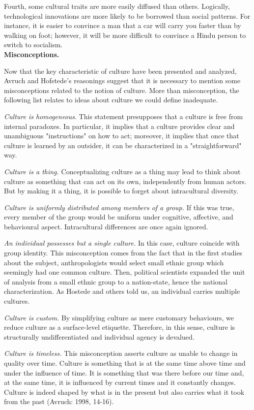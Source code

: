 \documentclass[../main.tex]{subfiles}
\begin{document}
Fourth, some cultural traits are more easily diffused than others. Logically, technological innovations are more likely to be borrowed than social patterns. For instance, it is easier to convince a man that a car will carry you faster than by walking on foot; however, it will be more difficult to convince a Hindu person to switch to socialism.\\

\textbf{Misconceptions.}

Now that the key characteristic of culture have been presented and analyzed, Avruch and Hofstede's reasonings suggest that it is necessary to mention some misconceptions related to the notion of culture. More than misconception, the following list relates to ideas about culture we could define inadequate.

\textit{Culture is homogeneous}. This statement presupposes that a culture is free from internal paradoxes. In particular, it implies that a culture provides clear and unambiguous "instructions" on how to act; moreover, it implies that once that culture is learned by an outsider, it can be characterized in a "straightforward" way.

\textit{Culture is a thing.} Conceptualizing culture as a thing may lead to think about culture as something that can act on its own, independently from human actors. But by making it a thing, it is possible to forget about intracultural diversity.

\textit{Culture is uniformly distributed among members of a group.} If this was true, every member of the group would be uniform under cognitive, affective, and behavioural aspect. Intracultural differences are once again ignored.

\textit{An individual possesses but a single culture.} In this case, culture coincide with group identity. This misconception comes from the fact that in the first studies about the subject, anthropologists would select small ethnic group which seemingly had one common culture. Then, political scientists expanded the unit of analysis from a small ethnic group to a nation-state, hence the national characterization. As Hostede and others told us, an individual carries multiple cultures.

\textit{Culture is custom.} By simplifying culture as mere customary behaviours, we reduce culture as a surface-level etiquette. Therefore, in this sense, culture is structurally undifferentiated and individual agency is devalued.

\textit{Culture is timeless.} This misconception asserts culture as unable to change in quality over time. Culture is something that is at the same time above time and under the influence of time. It is something that was there before our time and, at the same time, it is influenced by current times and it constantly changes. Culture is indeed shaped by what is in the present but also carries what it took from the past (Avruch: 1998, 14-16).
\end{document}
